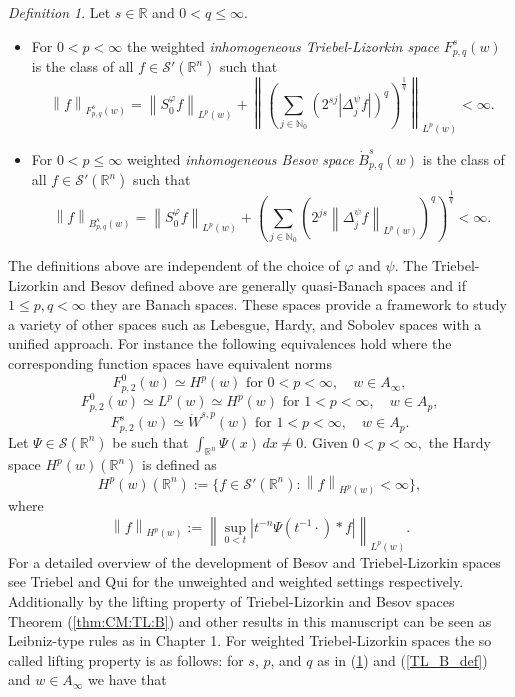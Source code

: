 \documentclass[10pt,a4paper]{article}
\theoremstyle{remark}
\newtheorem{dfn}{Definition}[section]
\newcommand{\naz}{\mathbb{N}_0}
\newcommand{\re}{\mathbb{R}}
\newcommand{\rn}{{{\mathbb R}^n}}
\newcommand{\sw}{{\mathcal{S}}(\rn)}
\newcommand{\swp}{{\mathcal{S}'}(\rn)}
\newcommand{\itlw}[4]{F_{#1,#3}^{#2}(#4)} %
\newcommand{\besw}[4]{\dot B_{#1,#3}^{#2}(#4)} %
\newcommand{\ibesw}[4]{B_{#1,#3}^{#2}(#4)} %
\newcommand{\lebw}[2]{L^{#1}(#2)} %
\newcommand{\dx}{\, dx}
\newcommand{\abs}[1]{\left\vert #1 \right\vert}
\newcommand{\norm}[2]{\left\|#1\right\|_{#2}}
\begin{document}
\begin{dfn}\label{ITL_B_def}
Let $s\in\mathbb{R}$ and $0<q\leq\infty$.
\begin{itemize}
\item For $0<p<\infty$ the weighted \textit{inhomogeneous Triebel-Lizorkin space} $\itlw{p}{s}{q}{w}$ is the class of all $f\in\mathcal{S}'(\rn)$ such that
\begin{equation*}
\norm{f}{\itlw{p}{s}{q}{w}}= \norm{S^\varphi_0 f}{L^p(w)} + \norm{\left(\sum_{j\in\naz}(2^{sj}|\Delta^\psi_jf|)^q\right)^{\frac{1}{q}}}{\lebw{p}{w}}<\infty.
\end{equation*}
\item For $0<p\leq\infty$ weighted \textit{inhomogeneous Besov space} $\besw{p}{s}{q}{w}$ is the class of all $f\in\mathcal{S}'(\rn)$ such that 
\begin{equation*}
\norm{f}{\ibesw{p}{s}{q}{w}} = \norm{S^\varphi_0 f}{L^p(w)} + \left(\sum_{j\in\naz} (2^{js}\norm{\Delta^\psi_jf}{L^p(w)})^q\right)^{\frac{1}{q}} < \infty.
\end{equation*}
\end{itemize}
\end{dfn}

The definitions above are independent of the choice of $\varphi$ and $\psi$. The Triebel-Lizorkin and Besov defined above are generally quasi-Banach spaces and if $1\leq p,q <\infty$ they are Banach spaces. These spaces provide a framework to study a variety of other spaces such as Lebesgue, Hardy, and Sobolev spaces with a unified approach.  For instance the following equivalences hold where the corresponding function spaces have equivalent norms 
\begin{equation}\label{TL&Hardy}
 \itlw{p}{0}{2}{w} \simeq H^p (w) \text{ for } 0<p<\infty, \quad w\in A_\infty, 
\end{equation}
\begin{equation}
 \itlw{p}{0}{2}{w} \simeq L^p(w) \simeq H^p(w) \text{ for } 1<p<\infty, \quad w\in A_p, 
\end{equation}
\begin{equation}
 \itlw{p}{s}{2}{w} \simeq \dot{W}^{s,p}(w) \text{ for } 1<p<\infty, \quad w\in A_p.
\end{equation}
Let $\Psi\in \sw$ be such that $\int_{\rn}\Psi(x)\dx\neq 0.$ Given $0<p<\infty,$ the  Hardy space $H^p(w)(\rn)$ is defined as 
\begin{equation*}
H^p(w)(\re^n) :=\{f \in \swp: \norm{f}{H^p(w)}< \infty \},
\end{equation*}
where 
\[
\norm{f}{H^p(w)}:= \norm{\sup_{0<t} \abs{t^{-n}\Psi(t^{-1}\cdot)\ast f}}{L^p(w)} .
\]
For a detailed overview of the development of Besov and Triebel-Lizorkin spaces see Triebel \cite{MR3024598} and Qui \cite{MR676560} for the unweighted and weighted settings respectively.
Additionally by the lifting property of Triebel-Lizorkin and Besov spaces Theorem (\ref{thm:CM:TL:B}) and other results in this manuscript can be seen as Leibniz-type rules as in Chapter 1. 
For weighted Triebel-Lizorkin spaces the so called lifting property is as follows: for $s$, $p$, and $q$ as in (\ref{ITL_B_def}) and (\ref{TL_B_def}) and $w\in A_\infty$ we have that 
\end{document}
